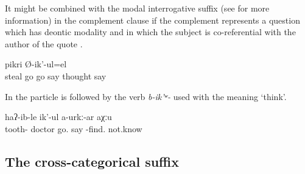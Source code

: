 It might be combined with the modal interrogative suffix (see  for more information) in the complement clause if the complement represents a question which has deontic modality and in which the subject is co-referential with the author of the quote .
%
\begin{exe}
	\ex	\label{ex:(He) is probably thinking, Should I go stealing or should I not go?}
	\gll	[d-iʡ-ij	uq'-ide=l	a-w-q'-idel	Ø-ik'-ul]		pikri	Ø-ik'-ul=el\\
		steal	go	go	say	thought	say\\
	\glt	{}
\end{exe}


In  the particle  is followed by the verb 
\textit{b-ik'ʷ-} used with the meaning `think'. 

\begin{exe}
	\ex	\label{ex:‎‎‎‎I will become a dentist, he probably thinks, I do not know.}
	\gll	[cul-b-a-la	tuχtur	arg-an=da]	haʔ-ib-le	ik'-ul	a-urkː-ar	aχːu\\
		tooth-	doctor	go.	say	-find.	not.know\\
	\glt	{}
\end{exe}

	



\subsection{The cross-categorical suffix \protect{}}
\label{ssec:The attributive marker -ce (-te)COMPL}

